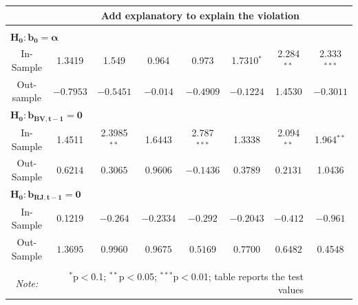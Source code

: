 \documentclass[a4paper]{article}
\begin{document}
\begin{table}[H]
\begin{tabular}{@{\extracolsep{5pt}}cccccccc}
&\multicolumn{7}{c}{\textbf{Add explanatory to explain the violation}} \\
\hline \\[-1.8ex] 
\multicolumn{3}{l}{$\mathbf{H_0: b_0 = \alpha}$} & \\
In-Sample & 1.3419 & 1.549 & 0.964 & 0.973 & 1.7310$^{*}$ & 2.284$^{**}$ & 2.333$^{***}$\\ 
Out-sample & $-0.7953$ & $-0.5451$ & $-0.014$ & $-0.4909$ & $-0.1224$ & 1.4530 & $-0.3011$\\ [1.8ex]

\multicolumn{3}{l}{$\mathbf{H_0: b_{BV,t-1}= 0}$} & \\
In-Sample & 1.4511 & 2.3985$^{**}$ & 1.6443 & 2.787$^{***}$ & 1.3338 & 2.094$^{**}$ & 1.964$^{**}$\\ 
Out-Sample & $0.6214$ & $0.3065$ & $0.9606$ & $-0.1436$ & $0.3789$ & $0.2131$ & 1.0436 \\ [1.8ex]

\multicolumn{3}{l}{$\mathbf{H_0: b_{RJ,t-1}= 0}$} & \\
In-Sample & 0.1219 & $-0.264$ & $-0.2334$ & $-0.292$ & $-0.2043$ & $-0.412$ & $-0.961$\\ 
Out-Sample & $1.3695$ & $0.9960$ & $0.9675$ & $0.5169$ & $0.7700$ & $0.6482$ & 0.4548 \\ 
\hline 
\\[-1.8ex]
\textit{Note:}  & \multicolumn{6}{r}{$^{*}$p$<$0.1; $^{**}$p$<$0.05; $^{***}$p$<$0.01; table reports the test values} \\ 
\end{tabular} 
\end{table} 














\end{document}

